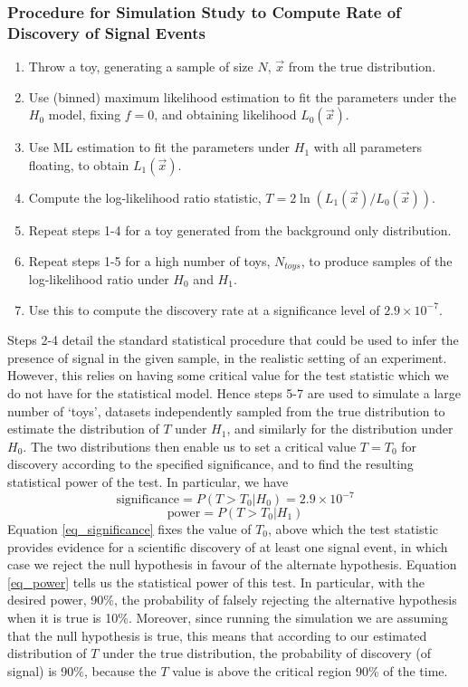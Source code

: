 \documentclass[12pt]{article}
\begin{document}
\subsubsection*{Procedure for Simulation Study to Compute Rate of Discovery of Signal Events}
\begin{enumerate}
    \item Throw a toy, generating a sample of size $N$, $\vec{x}$ from the true distribution.
    \item Use (binned) maximum likelihood estimation to fit the parameters under the $H_0$ model, fixing $f=0$, and obtaining likelihood $L_0(\vec{x})$.
    \item Use ML estimation to fit the parameters under $H_1$ with all parameters floating, to obtain $L_1(\vec{x})$.
    \item Compute the log-likelihood ratio statistic, $T = 2\ln(L_1(\vec{x})/L_0(\vec{x}))$.
    \item Repeat steps 1-4 for a toy generated from the background only distribution.
    \item Repeat steps 1-5 for a high number of toys, $N_{toys}$, to produce samples of the log-likelihood ratio under $H_0$ and $H_1$.
    \item Use this to compute the discovery rate at a significance level of $2.9\times10^{-7}$.
\end{enumerate}
Steps 2-4 detail the standard statistical procedure that could be used to infer the presence of signal in the given sample, in the realistic setting of an experiment.
However, this relies on having some critical value for the test statistic which we do not have for the statistical model.
Hence steps 5-7 are used to simulate a large number of `toys', datasets independently sampled from the true distribution to estimate the distribution of $T$ under $H_1$, and similarly for the distribution under $H_0$.
The two distributions then enable us to set a critical value $T=T_0$ for discovery according to the specified significance, and to find the resulting statistical power of the test.
In particular, we have
\begin{equation}
\label{eq_significance}
    \text{significance} = P(T>T_0|H_0) = 2.9\times10^{-7}
\end{equation}
\begin{equation}
\label{eq_power}
    \text{power} = P(T>T_0|H_1)
\end{equation}
Equation \ref{eq_significance} fixes the value of $T_0$, above which the test statistic provides evidence for a scientific discovery of at least one signal event, in which case we reject the null hypothesis in favour of the alternate hypothesis.
Equation \ref{eq_power} tells us the statistical power of this test.
In particular, with the desired power, 90\%, the probability of falsely rejecting the alternative hypothesis when it is true is 10\%.
Moreover, since running the simulation we are assuming that the null hypothesis is true, this means that according to our estimated distribution of $T$ under the true distribution, the probability of discovery (of signal) is 90\%, because the $T$ value is above the critical region 90\% of the time.
\end{document}
